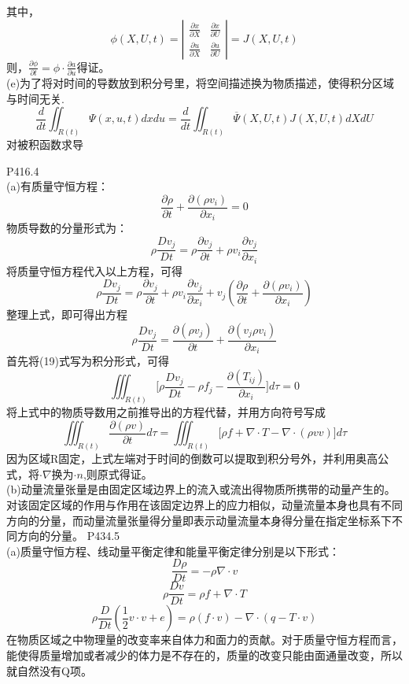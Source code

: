 \documentclass[UTF8]{ctexart}
\begin{document}
其中，
$$\phi(X,U,t) = 
{\left|
	\begin{array}{ccc}
		\frac{\partial x}{\partial X} & \frac{\partial x}{\partial U}\\
		\frac{\partial u}{\partial X} & \frac{\partial u}{\partial U}
	\end{array} 	
	\right |} = 
J(X,U,t)
$$
则，$\frac{\partial \phi}{\partial t} = \phi\cdot\frac{\partial a}{\partial u}
$得证。
\\(e)为了将对时间的导数放到积分号里，将空间描述换为物质描述，使得积分区域与时间无关.
$$
\frac{d}{dt}\iint_{R(t)} \Psi(x,u,t)dxdu = \frac{d}{dt} \iint_{R(t)} \overline\Psi(X,U,t)J(X,U,t)dXdU
$$
对被积函数求导







\newpage
{P416.4}
\\(a)有质量守恒方程：
$$
\frac{\partial \rho}{\partial t} + \frac{\partial(\rho v_i)}{\partial x_i}=0
$$
物质导数的分量形式为：
$$
\rho\frac{D v_j}{Dt}=\rho\frac{\partial v_j}{\partial t} + \rho v_i\frac{\partial v_j}{\partial x_i}
$$
将质量守恒方程代入以上方程，可得
$$
\rho\frac{D v_j}{Dt}=\rho\frac{\partial v_j}{\partial t} + \rho v_i\frac{\partial v_j}{\partial x_i} + v_j (\frac{\partial \rho}{\partial t} + \frac{\partial(\rho v_i)}{\partial x_i})
$$
整理上式，即可得出方程
$$
\rho\frac{D v_j}{Dt}=\frac{\partial(\rho v_j)}{\partial t}+\frac{\partial (v_j\rho v_i)}{\partial x_i}
$$
首先将(19)式写为积分形式，可得
$$
\iiint_{R(t)}\Big[\rho\frac{D v_j}{Dt} - \rho f_j - \frac{\partial(T_{ij})}{\partial x_i}\Big] d\tau = 0
$$
将上式中的物质导数用之前推导出的方程代替，并用方向符号写成
$$
\iiint_{R(t)} \frac{\partial (\rho v)}{\partial t} d\tau = 
\iiint_{R(t)} \Big[\rho f + \nabla\cdot T - \nabla\cdot(\rho vv)\Big]d\tau
$$
因为区域R固定，上式左端对于时间的倒数可以提取到积分号外，并利用奥高公式，将$\cdot \nabla$换为$\cdot n$,则原式得证。
\\(b)动量流量张量是由固定区域边界上的流入或流出得物质所携带的动量产生的。对该固定区域的作用与作用在该固定边界上的应力相似，动量流量本身也具有不同方向的分量，而动量流量张量得分量即表示动量流量本身得分量在指定坐标系下不同方向的分量。
\newpage
{P434.5}
\\(a)质量守恒方程、线动量平衡定律和能量平衡定律分别是以下形式：
$$\frac{D\rho}{Dt} = -\rho\nabla\cdot v$$
$$\rho\frac{Dv}{Dt} = \rho f + \nabla\cdot T$$
$$\rho\frac{D}{Dt}(\frac{1}{2}v\cdot v+e) = \rho(f\cdot v)-\nabla\cdot(q-T\cdot v)$$
在物质区域之中物理量的改变率来自体力和面力的贡献。对于质量守恒方程而言，能使得质量增加或者减少的体力是不存在的，质量的改变只能由面通量改变，所以就自然没有Q项。
\end{document}
